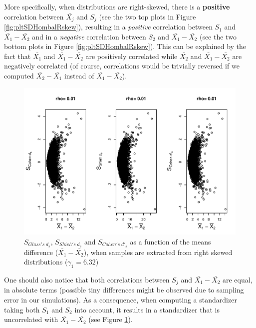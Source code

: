 \documentclass[
  man]{apa6}
\begin{document}
More specifically, when distributions are right-skewed, there is a \textbf{positive} correlation between \(\bar{X_j}\) and \(S_j\) (see the two top plots in Figure \ref{fig:pltSDHombalRskew}), resulting in a \emph{positive} correlation between \(S_1\) and \(\bar{X_1}-\bar{X_2}\) and in a \emph{negative} correlation between \(S_2\) and \(\bar{X_1}-\bar{X_2}\) (see the two bottom plots in Figure \ref{fig:pltSDHombalRskew}). This can be explained by the fact that \(\bar{X_1}\) and \(\bar{X_1}-\bar{X_2}\) are positively correlated while \(\bar{X_2}\) and \(\bar{X_1}-\bar{X_2}\) are negatively correlated (of course, correlations would be trivially reversed if we computed \(\bar{X_2}-\bar{X_1}\) instead of \(\bar{X_1}-\bar{X_2}\)).

\begin{figure}
\centering
\includegraphics{Correlation_files/figure-latex/pltStdzrHombalRskew-1.pdf}
\caption{\label{fig:pltStdzrHombalRskew}\(S_{Glass's \; d_s}\), \(S_{Shieh's \; d_s}\) and \(S_{Cohen's \; d'_s}\) as a function of the means difference (\(\bar{X_1}-\bar{X_2}\)), when samples are extracted from right skewed distributions (\(\gamma_1 = 6.32\))}
\end{figure}

One should also notice that both correlations between \(S_j\) and \(\bar{X_1}-\bar{X_2}\) are equal, in absolute terms (possible tiny differences might be observed due to sampling error in our simulations). As a consequence, when computing a standardizer taking both \(S_1\) and \(S_2\) into account, it results in a standardizer that is uncorrelated with \(\bar{X_1}-\bar{X_2}\) (see Figure \ref{fig:pltStdzrHombalRskew}).
\end{document}
